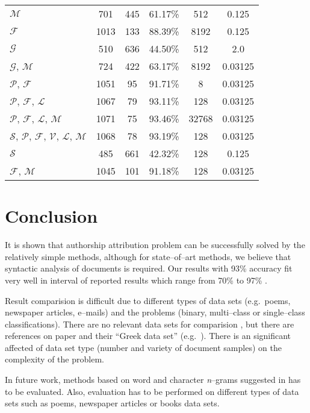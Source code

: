 \documentclass[11pt,english]{article}
\begin{document}
\begin{multicols}{2}
\begin{table*}
\begin{center}
\begin{tabular}{l c c c c c}
$\mathcal{M}$ & 701 & 445 & 61.17\% & 512 & 0.125\\
$\mathcal{F}$ & 1013 & 133 & 88.39\% & 8192 & 0.125\\
$\mathcal{G}$ & 510 & 636 & 44.50\% & 512 & 2.0\\
$\mathcal{G}$, $\mathcal{M}$ & 724 & 422 & 63.17\% & 8192 & 0.03125\\
$\mathcal{P}$, $\mathcal{F}$ & 1051 & 95 & 91.71\% & 8 & 0.03125\\
$\mathcal{P}$, $\mathcal{F}$, $\mathcal{L}$ & 1067 & 79 & 93.11\% & 128 & 0.03125\\
$\mathcal{P}$, $\mathcal{F}$, $\mathcal{L}$, $\mathcal{M}$ & 1071 & 75 & 93.46\% & 32768 & 0.03125\\
$\mathcal{S}$, $\mathcal{P}$, $\mathcal{F}$, $\mathcal{V}$, $\mathcal{L}$, $\mathcal{M}$ & 1068 & 78 & 93.19\% & 128 & 0.03125\\
$\mathcal{S}$ & 485 & 661 & 42.32\% & 128 & 0.125\\
$\mathcal{F}$, $\mathcal{M}$ & 1045 & 101 & 91.18\% & 128 & 0.03125\\ [1ex]
\hline
\end{tabular}
\label{tbl:eval}%
\end{center}
\end{table*}%

\section{Conclusion}
It is shown that authorship attribution problem can be successfully solved by
the relatively simple methods, although for state--of--art methods, we
believe that syntactic analysis of documents is required. Our results with
93\% accuracy fit very well in interval of reported results which range from
70\% to 97\% \citep{coyotl2006authorship,keselj2003n,luyckx2005shallow,stamatatos2001computer}.

Result comparision is difficult due to different types of data sets (e.g.\ poems,
newspaper articles, e--mails) and the problems (binary, multi--class or
single--class classifications). There are no relevant data sets for comparision
\citep{zhao2005effective}, but there are references on paper
\citep{stamatatos2001computer} and their ``Greek data set'' (e.g.\
\citep{keselj2003n}). There is an significant affected of data set type (number
and variety of document samples) on the complexity of the problem.

In future work, methods based on word and character \emph{n}--grams suggested
in \citep{keselj2003n,peng2003language,coyotl2006authorship} has to be
evaluated. Also, evaluation has to be performed on different types of data sets
such as poems, newspaper articles or books data sets.




\end{multicols}
\end{document}
